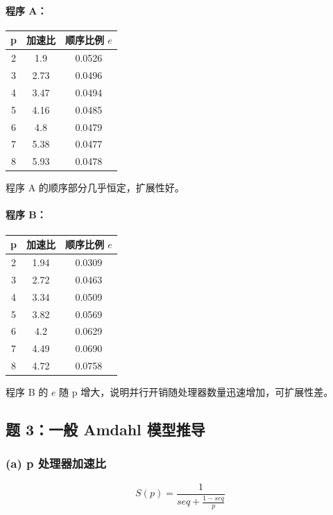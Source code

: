 \documentclass[12pt]{article}
\begin{document}
\paragraph{程序 A：}
\begin{center}
\begin{tabular}{c|c|c}
p & 加速比 & 顺序比例 $e$ \\ \hline
2 & 1.9 & 0.0526 \\
3 & 2.73 & 0.0496 \\
4 & 3.47 & 0.0494 \\
5 & 4.16 & 0.0485 \\
6 & 4.8 & 0.0479 \\
7 & 5.38 & 0.0477 \\
8 & 5.93 & 0.0478 \\
\end{tabular}
\end{center}

程序 A 的顺序部分几乎恒定，扩展性好。

\paragraph{程序 B：}
\begin{center}
\begin{tabular}{c|c|c}
p & 加速比 & 顺序比例 $e$ \\ \hline
2 & 1.94 & 0.0309 \\
3 & 2.72 & 0.0463 \\
4 & 3.34 & 0.0509 \\
5 & 3.82 & 0.0569 \\
6 & 4.2 & 0.0629 \\
7 & 4.49 & 0.0690 \\
8 & 4.72 & 0.0758 \\
\end{tabular}
\end{center}

程序 B 的 $e$ 随 p 增大，说明并行开销随处理器数量迅速增加，可扩展性差。

\subsection{题 3：一般 Amdahl 模型推导}

\subsubsection*{(a) p 处理器加速比}

\[
S(p) = \frac{1}{seq + \frac{1-seq}{p}}
\]
\end{document}
